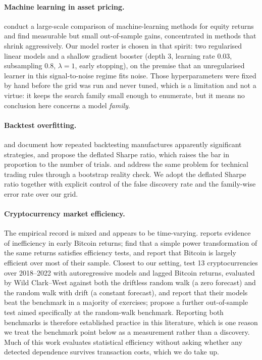 \documentclass{article}
\theoremstyle{plain}
\theoremstyle{definition}
\begin{document}
\paragraph{Machine learning in asset pricing.}
\citet{gu2020} conduct a large-scale comparison of machine-learning methods for
equity returns and find measurable but small out-of-sample gains, concentrated in
methods that shrink aggressively. Our model roster is chosen in that spirit:
two regularised linear models and a shallow gradient booster (depth 3, learning
rate $0.03$, subsampling $0.8$, $\lambda = 1$, early stopping), on the premise
that an unregularised learner in this signal-to-noise regime fits noise. Those
hyperparameters were fixed by hand before the grid was run and never tuned, which
is a limitation and not a virtue: it keeps the search family small enough to
enumerate, but it means no conclusion here concerns a model \emph{family}.

\paragraph{Backtest overfitting.}
\citet{bailey2014pseudo} and \citet{arnott2019} document how repeated backtesting
manufactures apparently significant strategies, and \citet{bailey2014} propose the
deflated Sharpe ratio, which raises the bar in proportion to the number of trials.
\citet{white2000} and \citet{sullivan1999} address the same problem for technical
trading rules through a bootstrap reality check. We adopt the deflated Sharpe
ratio together with explicit control of the false discovery rate and the
family-wise error rate over our grid.

\paragraph{Cryptocurrency market efficiency.}
The empirical record is mixed and appears to be time-varying.
\citet{urquhart2016} reports evidence of inefficiency in early Bitcoin returns;
\citet{nadarajah2017} find that a simple power transformation of the same returns
satisfies efficiency tests, and \citet{tiwari2018} report that Bitcoin is largely
efficient over most of their sample. Closest to our setting,
\citet{magner2022} test 13 cryptocurrencies over 2018--2022 with autoregressive
models and lagged Bitcoin returns, evaluated by Wild Clark--West against both the
driftless random walk (a zero forecast) and the random walk with drift (a constant
forecast), and report that their models beat the benchmark in a majority of
exercises; \citet{pincheira2022} propose a further out-of-sample test aimed
specifically at the random-walk benchmark. Reporting both benchmarks is therefore
established practice in this literature, which is one reason we treat the
benchmark point below as a measurement rather than a discovery. Much of this work
evaluates statistical efficiency without asking whether any detected dependence
survives transaction costs, which we do take up.
\end{document}
